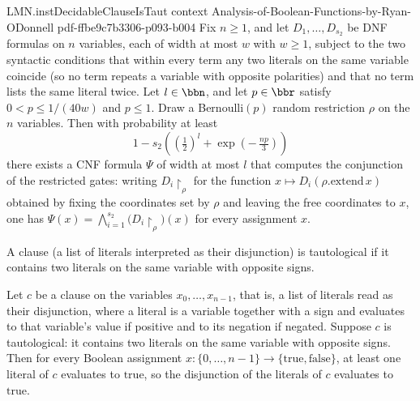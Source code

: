 \begin{theorem}
\proofstep
  {LMN.instDecidableClauseIsTaut}
  {context}
  {Analysis-of-Boolean-Functions-by-Ryan-ODonnell}
  {pdf-ffbe9c7b3306-p093-b004}
Fix $n \ge 1$, and let $D_1,\dots,D_{s_2}$ be DNF formulas on $n$ variables, each of
width at most $w$ with $w \ge 1$, subject to the two syntactic conditions that within
every term any two literals on the same variable coincide (so no term repeats a variable
with opposite polarities) and that no term lists the same literal twice. Let $l \in
\bbn$, and let $p \in \bbr$ satisfy $0 < p \le 1/(40w)$ and $p \le 1$. Draw a
Bernoulli$(p)$ random restriction $\rho$ on the $n$ variables. Then with probability at
least
\[
1 - s_2\!\left(\left(\tfrac{1}{2}\right)^{l} +
\exp\!\left(-\,\tfrac{np}{3}\right)\right)
\]
there exists a CNF formula $\Psi$ of width at most $l$ that computes the conjunction of
the restricted gates: writing $D_i\!\restriction_\rho$ for the function $x \mapsto
D_i(\rho.\mathrm{extend}\,x)$ obtained by fixing the coordinates set by $\rho$ and
leaving the free coordinates to $x$, one has $\Psi(x) = \bigwedge_{i=1}^{s_2}
\bigl(D_i\!\restriction_\rho\bigr)(x)$ for every assignment $x$.
\end{theorem}

\begin{definition}
\label{LMN.clauseIsTaut}
\leanok
{}
A clause (a list of literals interpreted as their disjunction) is tautological if it
contains two literals on the same variable with opposite signs.
\end{definition}

\begin{lemma}
\label{LMN.clauseIsTaut_eval_true}
\leanok
{}
Let $c$ be a clause on the variables $x_0,\dots,x_{n-1}$, that is, a list of literals
read as their disjunction, where a literal is a variable together with a sign and
evaluates to that variable's value if positive and to its negation if negated. Suppose
$c$ is tautological: it contains two literals on the same variable with opposite signs.
Then for every Boolean assignment $x \colon \{0,\dots,n-1\} \to
\{\text{true},\text{false}\}$, at least one literal of $c$ evaluates to $\mathrm{true}$,
so the disjunction of the literals of $c$ evaluates to $\mathrm{true}$.
\end{lemma}

